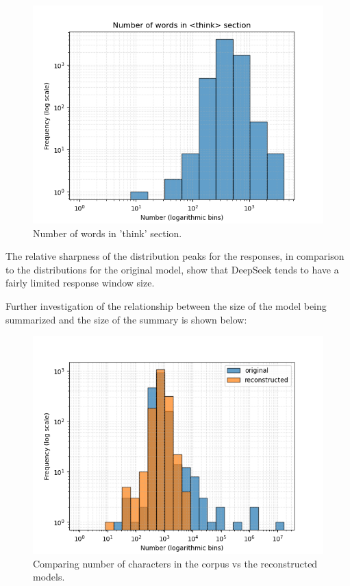 \documentclass[conference]{IEEEtran}
\begin{document}
            \begin{figure}[htbp]
                \centerline{\includegraphics[width=\linewidth]{"./Number of words in <think> section.png"}}
                \caption{Number of words in 'think' section.}
                \label{fig}
                \end{figure}

The relative sharpness of the distribution peaks for the responses, in comparison to the distributions for the original model, show that DeepSeek tends to have a fairly limited response window size.

Further investigation of the relationship between the size of the model being summarized and the size of the summary is shown below:

\begin{figure}[htbp]
    \centerline{\includegraphics[width=\linewidth]{"./Comparing number of characters in the corpus vs the reconstructed models.png"}}
    \caption{Comparing number of characters in the corpus vs the reconstructed models.}
    \label{fig}
    \end{figure}
    
\end{document}
